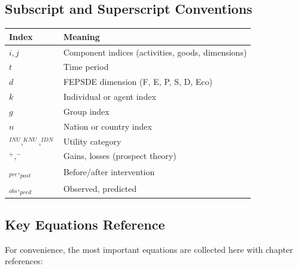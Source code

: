 \subsection{Subscript and Superscript Conventions}

\begin{center}
\renewcommand{\arraystretch}{1.3}
\begin{tabular}{lp{10cm}}
\hline
\textbf{Index} & \textbf{Meaning} \\
\hline
$i, j$ & Component indices (activities, goods, dimensions) \\
$t$ & Time period \\
$d$ & FEPSDE dimension (F, E, P, S, D, Eco) \\
$k$ & Individual or agent index \\
$g$ & Group index \\
$n$ & Nation or country index \\
$^{INU}, ^{KNU}, ^{IDN}$ & Utility category \\
$^{+}, ^{-}$ & Gains, losses (prospect theory) \\
$_{pre}, _{post}$ & Before/after intervention \\
$_{obs}, _{pred}$ & Observed, predicted \\
\hline
\end{tabular}
\end{center}

\subsection{Key Equations Reference}

For convenience, the most important equations are collected here with chapter references:

